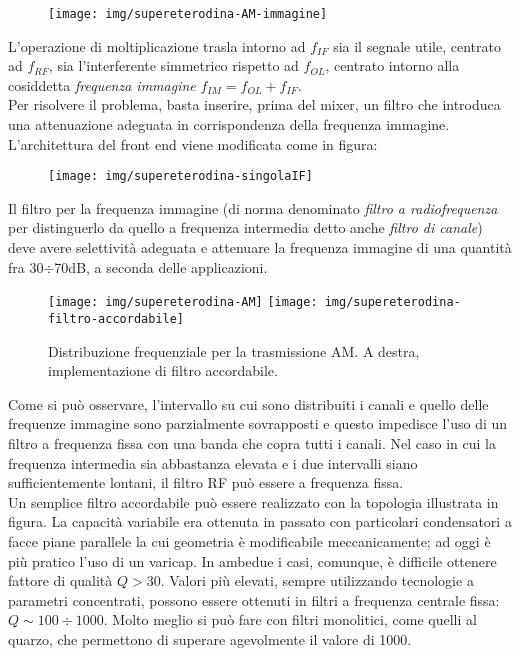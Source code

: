 \begin{figure}[hbt]
	\centering
	\texttt{[image: img/supereterodina-AM-immagine]}
	\caption{}
	\label{fig:supereterodina-am-immagine}
\end{figure}


L'operazione di moltiplicazione trasla intorno ad $f_{IF}$ sia il segnale utile, centrato ad $f_{RF}$, sia l'interferente simmetrico rispetto ad $f_{OL}$, centrato intorno alla cosiddetta \textit{frequenza immagine} $f_{IM} = f_{OL}+f_{IF}$.
\\
Per risolvere il problema, basta inserire, prima del mixer, un filtro che introduca una attenuazione adeguata in corrispondenza della frequenza immagine. L'architettura del front end viene modificata come in figura:

\begin{figure}[hbt]
	\centering
	\texttt{[image: img/supereterodina-singolaIF]}
	\caption{}
	\label{fig:supereterodina-singolaif}
\end{figure}


Il filtro per la frequenza immagine (di norma denominato \textit{filtro a radiofrequenza} per distinguerlo
da quello a frequenza intermedia detto anche \textit{filtro di canale}) deve avere selettività adeguata e attenuare la frequenza immagine di una quantità fra 30$\div$70dB, a seconda delle applicazioni.

\begin{figure}[hbt]
	\centering
	\texttt{[image: img/supereterodina-AM]}
	\hfill
	\texttt{[image: img/supereterodina-filtro-accordabile]}
	\caption{Distribuzione frequenziale per la trasmissione AM. A destra, implementazione di filtro accordabile.}
	\label{fig:supereterodina-am}
\end{figure}

Come si può osservare, l'intervallo su cui sono distribuiti i canali e quello delle frequenze immagine sono parzialmente sovrapposti e questo impedisce l'uso di un filtro a frequenza fissa con una banda che copra tutti i canali. Nel caso in cui la frequenza intermedia sia abbastanza elevata e i due intervalli siano sufficientemente lontani, il filtro RF può essere a frequenza fissa.
\\
Un semplice filtro accordabile può essere realizzato con la topologia illustrata in figura. La capacità variabile era ottenuta in passato con particolari condensatori a facce piane parallele la cui geometria è modificabile meccanicamente; ad oggi è più pratico l'uso di un varicap. In ambedue i casi, comunque, è difficile ottenere fattore di qualità $Q > 30$. Valori più elevati, sempre utilizzando tecnologie a parametri concentrati, possono essere ottenuti in filtri a frequenza centrale fissa: $Q \sim 100 \div1000$. Molto meglio si può fare con filtri monolitici, come quelli al quarzo, che permettono di superare agevolmente il valore di 1000.

